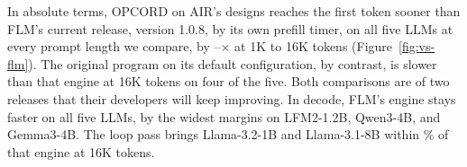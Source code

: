 In absolute terms, OPCORD on AIR's designs reaches the first token sooner than FLM's current release, version 1.0.8, by its own prefill timer, on all five LLMs at every prompt length we compare, by \AbsGainLo--\AbsGainHi$\times$ at 1K to 16K tokens (Figure~\ref{fig:vs-flm}).
The original program on its default configuration, by contrast, is slower than that engine at 16K tokens on four of the five.
Both comparisons are of two releases that their developers will keep improving.
In decode, FLM's engine stays faster on all five LLMs, by the widest margins on LFM2-1.2B, Qwen3-4B, and Gemma3-4B.
The loop pass brings Llama-3.2-1B and Llama-3.1-8B within \AbsDecodeClosePct\% of that engine at 16K tokens.

